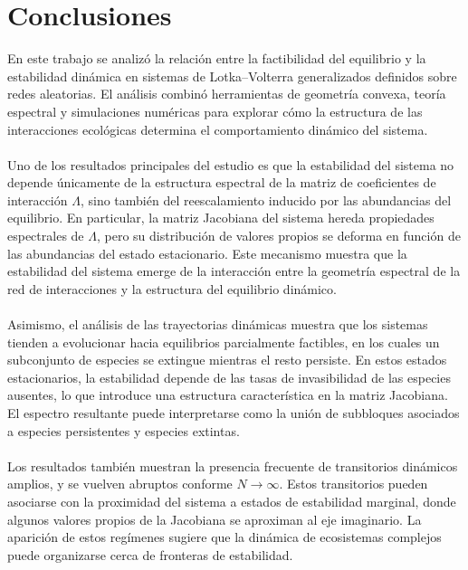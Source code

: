 %

\section{Conclusiones}

\setlength{\parindent}{0cm} 

En este trabajo se analizó la relación entre la factibilidad del equilibrio y la estabilidad dinámica en sistemas de Lotka–Volterra generalizados definidos sobre redes aleatorias. El análisis combinó herramientas de geometría convexa, teoría espectral y simulaciones numéricas para explorar cómo la estructura de las interacciones ecológicas determina el comportamiento dinámico del sistema.
\\
\\
Uno de los resultados principales del estudio es que la estabilidad del sistema no depende únicamente de la estructura espectral de la matriz de coeficientes de interacción $\Lambda$, sino también del reescalamiento inducido por las abundancias del equilibrio. En particular, la matriz Jacobiana del sistema hereda propiedades espectrales de $\Lambda$, pero su distribución de valores propios se deforma en función de las abundancias del estado estacionario. Este mecanismo muestra que la estabilidad del sistema emerge de la interacción entre la geometría espectral de la red de interacciones y la estructura del equilibrio dinámico.
\\
\\
Asimismo, el análisis de las trayectorias dinámicas muestra que los sistemas tienden a evolucionar hacia equilibrios parcialmente factibles, en los cuales un subconjunto de especies se extingue mientras el resto persiste. En estos estados estacionarios, la estabilidad depende de las tasas de invasibilidad de las especies ausentes, lo que introduce una estructura característica en la matriz Jacobiana. El espectro resultante puede interpretarse como la unión de subbloques asociados a especies persistentes y especies extintas.
\\
\\
Los resultados también muestran la presencia frecuente de transitorios dinámicos amplios, y se vuelven abruptos conforme $N\to\infty$. Estos transitorios pueden asociarse con la proximidad del sistema a estados de estabilidad marginal, donde algunos valores propios de la Jacobiana se aproximan al eje imaginario. La aparición de estos regímenes sugiere que la dinámica de ecosistemas complejos puede organizarse cerca de fronteras de estabilidad.
